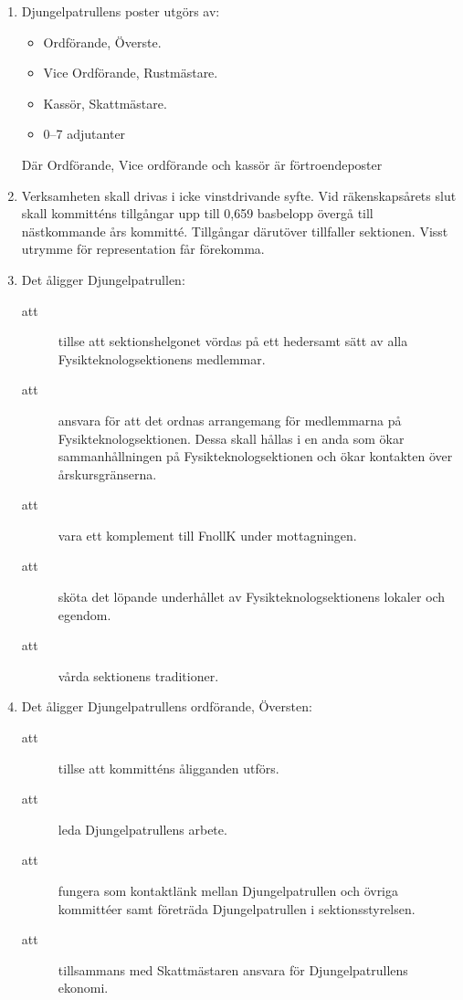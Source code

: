 \documentclass[11pt,a4paper]{article}
\begin{document}
\begin{enumerate}[\thesubsection .1]

  \item Djungelpatrullens poster utgörs av:
    \begin{itemize}
      \item Ordförande, Överste.
      \item Vice Ordförande, Rustmästare.
      \item Kassör, Skattmästare.
      \item 0--7 adjutanter
    \end{itemize}
Där Ordförande, Vice ordförande och kassör är förtroendeposter



  \item Verksamheten skall drivas i icke vinstdrivande syfte. Vid
  räkenskaps\-årets slut skall kommitténs tillgångar upp till 0,659
  basbelopp övergå till nästkommande års kommitté. Tillgångar
  därutöver tillfaller sektionen. Visst utrymme för representation får
  förekomma.

  \item Det åligger Djungelpatrullen:
    \begin{description}
      \item[att] tillse att sektionshelgonet vördas på ett hedersamt sätt av alla
	Fysikteknologsektionens medlemmar.   
      \item[att] ansvara för att det ordnas arrangemang för medlemmarna på
	Fysikteknologsektionen. Dessa skall hållas i en anda som ökar samman\-håll\-ning\-en på
	Fysikteknologsektionen och ökar kontakten över årskursgränserna.
      \item[att] vara ett komplement till FnollK under mottagningen. 
      \item[att] sköta det löpande underhållet av Fysikteknologsektionens lokaler och egendom.
      \item[att] vårda sektionens traditioner.

   
    \end{description}

  \item Det åligger Djungelpatrullens ordförande, Översten:
    \begin{description}
      \item[att] tillse att kommitténs åligganden utförs. 
      \item[att] leda Djungelpatrullens arbete.
      \item[att] fungera som kontaktlänk mellan Djungelpatrullen och
      övriga kommittéer samt företräda Djungelpatrullen i sektionsstyrelsen.
      \item[att] tillsammans med Skattmästaren ansvara för Djungelpatrullens ek\-o\-nomi.
    \end{description}


\end{enumerate}
\end{document}
